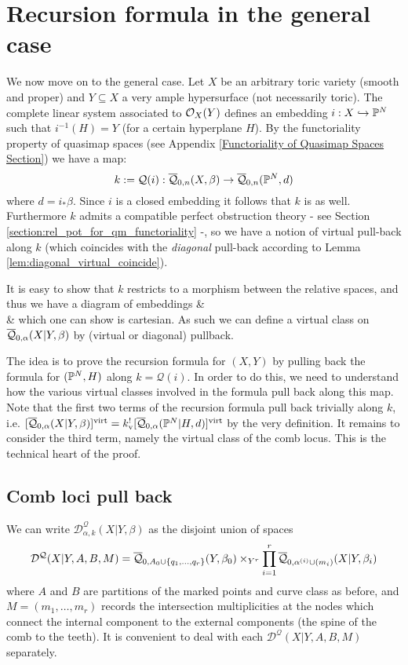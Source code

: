 \section{Recursion formula in the general case}
We now move on to the general case. Let $X$ be an arbitrary toric variety (smooth and proper) and $Y \subseteq X$ a very ample hypersurface (not necessarily toric). The complete linear system associated to $\mathcal{O}_X(Y)$ defines an embedding $i : X \hookrightarrow \mathbb P^N$ such that $i^{-1}(H) = Y$ (for a certain hyperplane $H$). By the functoriality property of quasimap spaces (see Appendix \ref{Functoriality of Quasimap Spaces Section}) we have a map:
\begin{equation*} k := \mathcal Q(i) : \overline{\mathcal Q}_{0,n}(X,\beta) \rightarrow \overline{\mathcal Q}_{0,n}(\mathbb P^N,d) \end{equation*}
where $d=i_*\beta$. Since $i$ is a closed embedding it follows that $k$ is as well. Furthermore $k$ admits a compatible perfect obstruction theory - see Section \ref{section:rel_pot_for_qm_functoriality} -, so we have a notion of virtual pull-back along $k$ (which coincides with the \emph{diagonal} pull-back according to Lemma \ref{lem:diagonal_virtual_coincide}).

It is easy to show that $k$ restricts to a morphism between the relative spaces, and thus we have a diagram of embeddings
\bcd
{} \ar[d, "f", hook] \ar[r, "g", hook]  &  \ar[d, "j", hook] \\
  \ar[r, "k", hook] & 
\ecd
which one can show is cartesian. As such we can define a virtual class on $\overline{\mathcal Q}_{0,\alpha}(X|Y,\beta)$ by (virtual or diagonal) pullback.

The idea is to prove the recursion formula for $(X,Y)$ by pulling back the formula for $(\mathbb P^N,H)$ along $k = \mathcal Q(i)$. In order to do this, we need to understand how the various virtual classes involved in the formula pull back along this map. Note that the first two terms of the recursion formula pull back trivially along $k$, i.e. $[\overline{\mathcal Q}_{0,\alpha}(X|Y,\beta)]^{\operatorname{virt}}=k_{\text{v}}^![\overline{\mathcal Q}_{0,\alpha}(\mathbb P^N|H,d)]^{\operatorname{virt}}$ by the very definition. It remains to consider the third term, namely the virtual class of the comb locus. This is the technical heart of the proof.

\subsection{Comb loci pull back}
We can write $\mathcal D^\mathcal{Q}_{\alpha,k}(X|Y,\beta)$ as the disjoint union of spaces
\begin{equation*} \mathcal D^{\mathcal{Q}}(X|Y,A,B,M) = \overline{\mathcal Q}_{0,A_0 \cup \{q_1, \ldots, q_r\}}(Y,\beta_0) \times_{Y^r} \prod_{i=1}^r \overline{\mathcal Q}_{0,\alpha^{(i)}\cup (m_i)}(X|Y,\beta_i) \end{equation*}
where $A$ and $B$ are partitions of the marked points and curve class as before, and $M=(m_1,\ldots,m_r)$ records the intersection multiplicities at the nodes which connect the internal component to the external components (the spine of the comb to the teeth). It is convenient to deal with each $\mathcal D^{\mathcal{Q}}(X|Y,A,B,M)$ separately.

